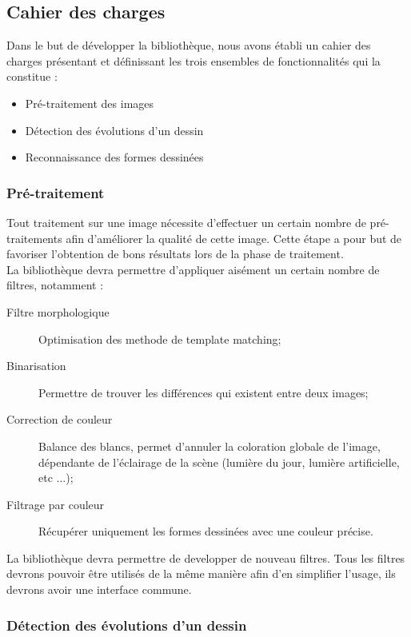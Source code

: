 \subsection{Cahier des charges}

Dans le but de développer la bibliothèque, nous avons établi un cahier des charges présentant et définissant les trois ensembles de fonctionnalités qui la constitue :
\begin{itemize}
\item Pré-traitement des images
\item Détection des évolutions d'un dessin
\item Reconnaissance des formes dessinées
\end{itemize}

\subsubsection{Pré-traitement}

Tout traitement sur une image nécessite d'effectuer un certain nombre de pré-traitements afin d'améliorer la qualité de cette image. Cette étape a pour but de favoriser l'obtention de bons résultats lors de la phase de traitement.\\

La bibliothèque devra permettre d'appliquer aisément un certain nombre de filtres, notamment :

\begin{description}
\item[Filtre morphologique] Optimisation des methode de template matching;
\item[Binarisation] Permettre de trouver les différences qui existent entre deux images;
\item[Correction de couleur] Balance des blancs, permet d'annuler la coloration globale de l'image, dépendante de l'éclairage de la scène (lumière du jour, lumière artificielle, etc ...);
\item[Filtrage par couleur] Récupérer uniquement les formes dessinées avec une couleur précise.
\end{description}

La bibliothèque devra permettre de developper de nouveau filtres. Tous les filtres devrons pouvoir être utilisés de la même manière afin d'en simplifier l'usage, ils devrons avoir une interface commune.


\subsubsection{Détection des évolutions d'un dessin}

